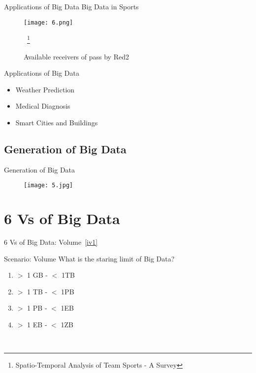 \documentclass[pdf]{beamer}
\begin{document}
\begin{frame}[fragile]{Applications of Big Data}
Big Data in Sports~\cite{GudmundssonH16}
	 \begin{figure}[ht]
	    \begin{center}
        		\texttt{[image: 6.png]}
		\caption{Available receivers of pass by Red2}
            ~\footnote{Spatio-Temporal Analysis of Team Sports - {A} Survey}
    \end{center}
    \end{figure}
\end{frame}
\begin{frame}[fragile]{Applications of Big Data}
\begin{itemize}
    \item Weather Prediction
    \item Medical Diagnosis
    \item Smart Cities and Buildings
 \end{itemize}	
\end{frame}

\subsection[Generation of Big Data]{Generation of Big Data}
\begin{frame}[fragile]{Generation of Big Data}
	 \begin{figure}[ht]
	    \begin{center}
        		\texttt{[image: 5.jpg]}
    \end{center}
    \end{figure}
\end{frame}

\section[6 Vs of Big Data]{6 Vs of Big Data}
\begin{frame}[fragile, label={vol}]{6 Vs of Big Data\cite{5vs}: Volume~\ref{iv1}}
\end{frame}

\begin{frame}[fragile]{Scenario: Volume}
What is the staring limit of Big Data?
\begin{enumerate}[A]
\item $>$ 1 GB - $<$ 1TB \pause
\item  $>$ 1 TB - $<$ 1PB\pause
\item $>$ 1 PB - $<$ 1EB\pause
\item $>$ 1 EB - $<$ 1ZB\pause
\end{enumerate}
\\

\end{frame}
\end{document}
